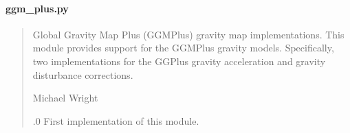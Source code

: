 \documentclass[letterpaper,10pt,english]{sphinxmanual}
\begin{document}
\paragraph{ggm\_plus.py}
\label{\detokenize{modules/gravity/ggm_plus:ggm-plus-py}}\begin{quote}\begin{description}
\sphinxAtStartPar
Global Gravity Map Plus (GGMPlus) gravity map implementations.
This module provides support for the GGMPlus gravity models. Specifically,
two implementations for the GGPlus gravity acceleration and gravity
disturbance corrections.

\sphinxAtStartPar
Michael Wright \sphinxhyphen{} 

.0 \sphinxhyphen{} First implementation of this module.

\end{description}\end{quote}
\end{document}

